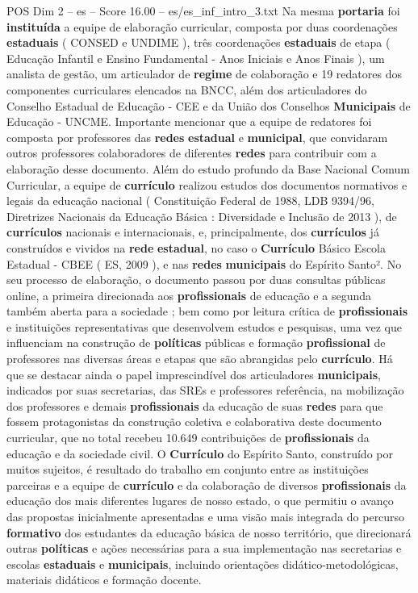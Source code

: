\begin{textsample}{POS Dim 2 – es – Score 16.00 – es/es\_inf\_intro\_3.txt}
Na mesma \textbf{portaria} foi \textbf{instituída} a equipe de elaboração curricular, composta por duas coordenações \textbf{estaduais} ( CONSED e UNDIME ), três coordenações \textbf{estaduais} de etapa ( Educação Infantil e Ensino Fundamental - Anos Iniciais e Anos Finais ), um analista de gestão, um articulador de \textbf{regime} de colaboração e 19 redatores dos componentes curriculares elencados na BNCC, além dos articuladores do Conselho Estadual de Educação - CEE e da União dos Conselhos \textbf{Municipais} de Educação - UNCME.
Importante mencionar que a equipe de redatores foi composta por professores das \textbf{redes} \textbf{estadual} e \textbf{municipal}, que convidaram outros professores colaboradores de diferentes \textbf{redes} para contribuir com a elaboração desse documento.
Além do estudo profundo da Base Nacional Comum Curricular, a equipe de \textbf{currículo} realizou estudos dos documentos normativos e legais da educação nacional ( Constituição Federal de 1988, LDB 9394/96, Diretrizes Nacionais da Educação Básica : Diversidade e Inclusão de 2013 ), de \textbf{currículos} nacionais e internacionais, e, principalmente, dos \textbf{currículos} já construídos e vividos na \textbf{rede} \textbf{estadual}, no caso o \textbf{Currículo} Básico Escola Estadual - CBEE ( ES, 2009 ), e nas \textbf{redes} \textbf{municipais} do Espírito Santo².
No seu processo de elaboração, o documento passou por duas consultas públicas online, a primeira direcionada aos \textbf{profissionais} de educação e a segunda também aberta para a sociedade ; bem como por leitura crítica de \textbf{profissionais} e instituições representativas que desenvolvem estudos e pesquisas, uma vez que influenciam na construção de \textbf{políticas} públicas e formação \textbf{profissional} de professores nas diversas áreas e etapas que são abrangidas pelo \textbf{currículo}.
Há que se destacar ainda o papel imprescindível dos articuladores \textbf{municipais}, indicados por suas secretarias, das SREs e professores referência, na mobilização dos professores e demais \textbf{profissionais} da educação de suas \textbf{redes} para que fossem protagonistas da construção coletiva e colaborativa deste documento curricular, que no total recebeu 10.649 contribuições de \textbf{profissionais} da educação e da sociedade civil.
O \textbf{Currículo} do Espírito Santo, construído por muitos sujeitos, é resultado do trabalho em conjunto entre as instituições parceiras e a equipe de \textbf{currículo} e da colaboração de diversos \textbf{profissionais} da educação dos mais diferentes lugares de nosso estado, o que permitiu o avanço das propostas inicialmente apresentadas e uma visão mais integrada do percurso \textbf{formativo} dos estudantes da educação básica de nosso território, que direcionará outras \textbf{políticas} e ações necessárias para a sua implementação nas secretarias e escolas \textbf{estaduais} e \textbf{municipais}, incluindo orientações didático-metodológicas, materiais didáticos e formação docente.

\end{textsample}
